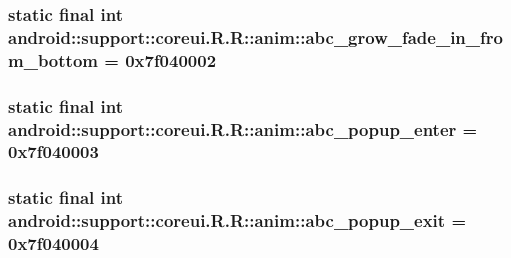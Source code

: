 \hypertarget{classandroid_1_1support_1_1coreui_1_1_r_1_1anim_792007e285357bc8a151eab9c7cd851e}{
\subsubsection[{abc\_\-grow\_\-fade\_\-in\_\-from\_\-bottom}]{\setlength{\rightskip}{0pt plus 5cm}static final int android::support::coreui.R.R::anim::abc\_\-grow\_\-fade\_\-in\_\-from\_\-bottom = 0x7f040002}}
\label{classandroid_1_1support_1_1coreui_1_1_r_1_1anim_792007e285357bc8a151eab9c7cd851e}


\hypertarget{classandroid_1_1support_1_1coreui_1_1_r_1_1anim_95d53b9ce35fea81a3d528746f55673e}{
\subsubsection[{abc\_\-popup\_\-enter}]{\setlength{\rightskip}{0pt plus 5cm}static final int android::support::coreui.R.R::anim::abc\_\-popup\_\-enter = 0x7f040003}}
\label{classandroid_1_1support_1_1coreui_1_1_r_1_1anim_95d53b9ce35fea81a3d528746f55673e}


\hypertarget{classandroid_1_1support_1_1coreui_1_1_r_1_1anim_5406070d8b33203450a035e68281e45e}{
\subsubsection[{abc\_\-popup\_\-exit}]{\setlength{\rightskip}{0pt plus 5cm}static final int android::support::coreui.R.R::anim::abc\_\-popup\_\-exit = 0x7f040004}}
\label{classandroid_1_1support_1_1coreui_1_1_r_1_1anim_5406070d8b33203450a035e68281e45e}


